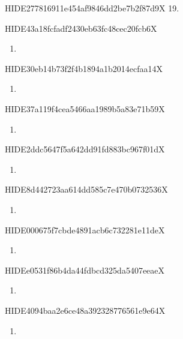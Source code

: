 \documentclass[
  ukrainian,
]{article}
\providecommand{\tightlist}{%
  \setlength{\itemsep}{0pt}\setlength{\parskip}{0pt}}
\begin{document}
HIDE277816911e454af9846dd2be7b2f87d9X 19.

HIDE43a18fcfadf2430eb63fc48cec20fcb6X

\begin{enumerate}
\def\labelenumi{\arabic{enumi}.}
\setcounter{enumi}{9}
\tightlist
\item
\end{enumerate}

HIDE30eb14b73f2f4b1894a1b2014ecfaa14X

\begin{enumerate}
\def\labelenumi{\arabic{enumi}.}
\setcounter{enumi}{9}
\tightlist
\item
\end{enumerate}

HIDE37a119f4cea5466aa1989b5a83e71b59X

\begin{enumerate}
\def\labelenumi{\arabic{enumi}.}
\setcounter{enumi}{10}
\tightlist
\item
\end{enumerate}

HIDE2ddc5647f5a642dd91fd883bc967f01dX

\begin{enumerate}
\def\labelenumi{\arabic{enumi}.}
\setcounter{enumi}{11}
\tightlist
\item
\end{enumerate}

HIDE8d442723aa614dd585c7e470b0732536X

\begin{enumerate}
\def\labelenumi{\arabic{enumi}.}
\setcounter{enumi}{12}
\tightlist
\item
\end{enumerate}

HIDE000675f7cbde4891acb6c732281e11deX

\begin{enumerate}
\def\labelenumi{\arabic{enumi}.}
\setcounter{enumi}{13}
\tightlist
\item
\end{enumerate}

HIDEe0531f86b4da44fdbcd325da5407eeaeX

\begin{enumerate}
\def\labelenumi{\arabic{enumi}.}
\setcounter{enumi}{14}
\tightlist
\item
\end{enumerate}

HIDE4094baa2e6ce48a392328776561e9e64X

\begin{enumerate}
\def\labelenumi{\arabic{enumi}.}
\setcounter{enumi}{15}
\tightlist
\item
\end{enumerate}
\end{document}
